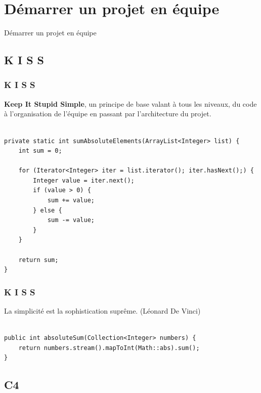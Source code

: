 \section{D\'{e}marrer un projet en \'{e}quipe}

\begin{frame}
    \begin{center}
    \fontsize{48pt}{7.2}\selectfont
    D\'{e}marrer un projet en \'{e}quipe
    \end{center}
\end{frame}

\subsection{K I S S}
\begin{frame}[fragile]
	\frametitle{K I S S}
	\textbf{Keep It Stupid Simple}, un principe de base valant \`{a} tous les niveaux, du code \`{a} l'organisation de l'\'{e}quipe en passant par l'architecture du projet.
    \\~\\    
	\begin{lstlisting}
private static int sumAbsoluteElements(ArrayList<Integer> list) {
	int sum = 0;

	for (Iterator<Integer> iter = list.iterator(); iter.hasNext();) {
		Integer value = iter.next();
		if (value > 0) {
			sum += value;
		} else {
			sum -= value;
		}
	}

	return sum;
}
	\end{lstlisting}
\end{frame}

\begin{frame}[fragile]
	\frametitle{K I S S}
    
    La simplicit\'{e} est la sophistication supr\^{e}me. (L\'{e}onard De Vinci)
    \\~\\
	\begin{lstlisting}
public int absoluteSum(Collection<Integer> numbers) {
	return numbers.stream().mapToInt(Math::abs).sum();
}
	\end{lstlisting}
\end{frame}


\subsection{C4}

